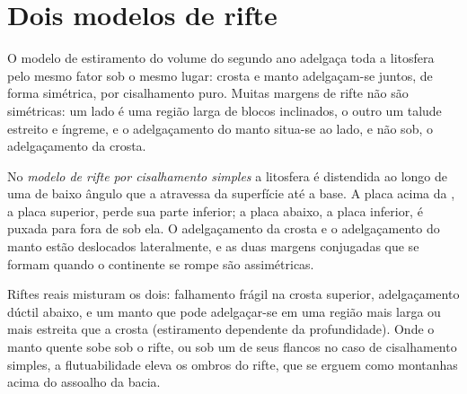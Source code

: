 \section{Dois modelos de rifte}\label{sec:b3:extension-strike-slip:models}

O modelo de estiramento do volume do segundo ano adelgaça toda a litosfera pelo
mesmo fator sob o mesmo lugar: crosta e manto adelgaçam-se juntos,
de forma simétrica, por cisalhamento puro. Muitas margens de rifte não são simétricas: um lado
é uma região larga de blocos inclinados, o outro um talude estreito e íngreme, e o
adelgaçamento do manto situa-se ao lado, e não sob, o adelgaçamento da crosta.

\begin{definition}\label{def:b3:extension-strike-slip:rift-models}
No \emph{modelo de rifte por cisalhamento simples} a
litosfera é distendida ao longo de uma  de baixo ângulo que a atravessa
da superfície até a base. A placa acima da , a placa superior,
perde sua parte inferior; a placa abaixo, a placa inferior, é puxada para fora
de sob ela. O adelgaçamento da crosta e o adelgaçamento do manto estão
deslocados lateralmente, e as duas margens conjugadas que se formam quando o continente
se rompe são assimétricas.
\end{definition}

Riftes reais misturam os dois: falhamento frágil na crosta superior, adelgaçamento dúctil
abaixo, e um manto que pode adelgaçar-se em uma região mais larga ou mais estreita que a
crosta (estiramento dependente da profundidade). Onde o manto quente sobe sob o
rifte, ou sob um de seus flancos no caso de cisalhamento simples, a flutuabilidade eleva os
ombros do rifte, que se erguem como montanhas acima do assoalho da bacia.

